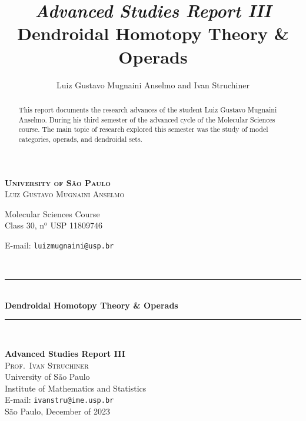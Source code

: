 \documentclass[11pt, reqno]{amsart}
\newcommand{\HRule}{\rule{\linewidth}{0.5mm}} %
\theoremstyle{definition}
\begin{document}
\begin{titlepage}
 \vfill
  \begin{center}
       \textsc{\LARGE \textbf{University of São Paulo}} \\[2.0cm]

       \vskip 0.5cm
       \textsc{\large Luiz Gustavo Mugnaini Anselmo}

       {\normalsize Molecular Sciences Course \\
         Class 30, n\(^{\text{o}}\)
         USP 11809746

       E-mail: \texttt{luizmugnaini@usp.br}}\\[2.0cm]

       \HRule\\
       \vskip 0.5cm
       {\LARGE \textbf{Dendroidal Homotopy Theory \& Operads}}
       \HRule\\[1.5cm]

       \hspace{.45\textwidth}
       \begin{minipage}{.5\textwidth}
       \normalsize \textbf{Advanced Studies Report III}\\[0.5cm]

       \textsc{\large Prof.~Ivan Struchiner}\\
       University of São Paulo \\
       Institute of Mathematics and Statistics \\
       E-mail: \texttt{ivanstru@ime.usp.br}\\[1cm]

       \normalsize São Paulo, December of 2023
       \end{minipage}
  \end{center}
\end{titlepage}

\title[Dendroidal Homotopy Theory \& Operads]{%
{\footnotesize\sl Advanced Studies Report III} \\ \smallskip
  Dendroidal Homotopy Theory \& Operads
}%

\author{%
  Luiz Gustavo Mugnaini Anselmo and Ivan Struchiner
}%

\address{%
  Institute of Mathematics and Statistics, University of São
  Paulo, Rua do Matão 1010, 05508--090~São Paulo, SP
}%


\begin{abstract}
    This report documents the research advances of the student Luiz Gustavo Mugnaini Anselmo. During his
    third semester of the advanced cycle of the Molecular Sciences course. The main topic of research
    explored this semester was the study of model categories, operads, and dendroidal sets.
\end{abstract}
\maketitle
\end{document}
